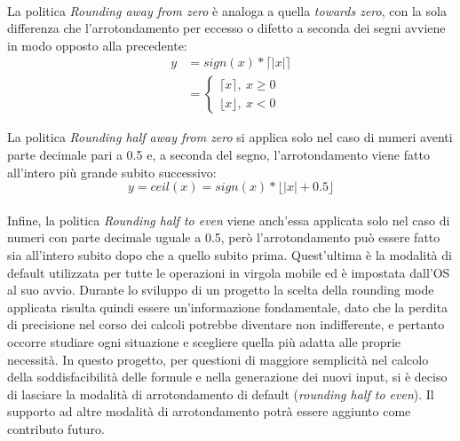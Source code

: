 \documentclass[Lau, oneside]{sapthesis}%
\begin{document}
\ \\
\newline
La politica \textit{Rounding away from zero} è analoga a quella \textit{towards zero}, con la sola differenza che l'arrotondamento per eccesso o difetto a seconda dei segni avviene in modo opposto alla precedente:
\begin{equation}
    \begin{aligned}
        y &= sign(x) * \lceil |x| \rceil \\
        &= \begin{cases} \lceil x \rceil, \  x \geq 0 \\ \lfloor x \rfloor, \  x < 0 \end{cases}
    \end{aligned}
\end{equation}



\newpage
La politica \textit{Rounding half away from zero} si applica solo nel caso di numeri aventi parte decimale pari a 0.5 e, a seconda del segno, l'arrotondamento viene fatto all'intero più grande subito successivo:
\begin{equation}
    y = ceil(x) = sign(x) * \lfloor |x|+0.5 \rfloor
\end{equation}
\ \\
\newline
Infine, la politica \textit{Rounding half to even} viene anch'essa applicata solo nel caso di numeri con parte decimale uguale a 0.5, però l'arrotondamento può essere fatto sia all'intero subito dopo che a quello subito prima.
\newline
Quest'ultima è la modalità di default utilizzata per tutte le operazioni in virgola mobile ed è impostata dall'OS al suo avvio.
\newline \newline \newline
Durante lo sviluppo di un progetto la scelta della rounding mode applicata risulta quindi essere un'informazione fondamentale, dato che la perdita di precisione nel corso dei calcoli potrebbe diventare non indifferente, e pertanto occorre studiare ogni situazione e scegliere quella più adatta alle proprie necessità.
\newline \newline
In questo progetto, per questioni di maggiore semplicità nel calcolo della soddisfacibilità delle formule e nella generazione dei nuovi input, si è deciso di lasciare la modalità di arrotondamento di default (\textit{rounding half to even}). 
\newline
Il supporto ad altre modalità di arrotondamento potrà essere aggiunto come contributo futuro.
\end{document}
